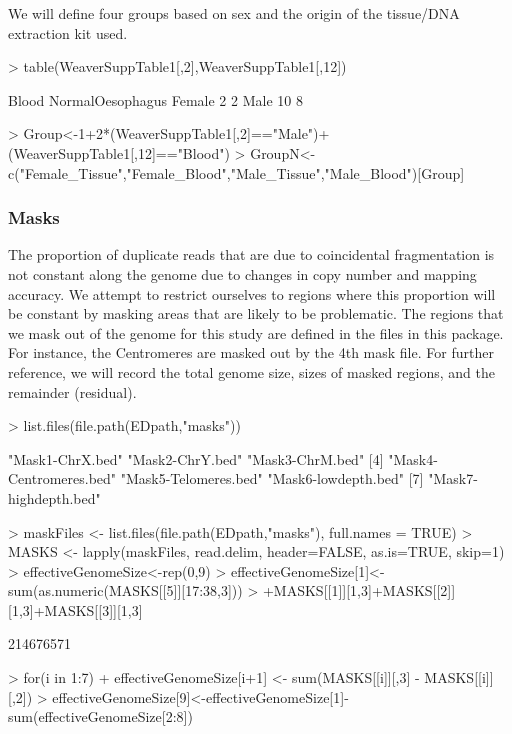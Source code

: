 \documentclass{article}
\begin{document}
We will define four groups based on sex and the origin of the tissue/DNA extraction kit used.

\begin{Schunk}
\begin{Sinput}
> table(WeaverSuppTable1[,2],WeaverSuppTable1[,12])
\end{Sinput}
\begin{Soutput}
         Blood NormalOesophagus
  Female     2                2
  Male      10                8
\end{Soutput}
\begin{Sinput}
> Group<-1+2*(WeaverSuppTable1[,2]=="Male")+(WeaverSuppTable1[,12]=="Blood")
> GroupN<-c("Female_Tissue","Female_Blood","Male_Tissue","Male_Blood")[Group]
\end{Sinput}
\end{Schunk}

\subsubsection{Masks}

The proportion of duplicate reads that are due to coincidental fragmentation is not constant along the genome due to changes in copy number and mapping accuracy. We attempt to restrict ourselves to regions where this proportion will be constant by masking areas that are likely to be problematic. The regions that we mask out of the genome for this study are defined in the  files in this package. For instance, the Centromeres are masked out by the 4th mask file. For further reference, we will record the total genome size, sizes of masked regions, and the remainder (residual).

\begin{Schunk}
\begin{Sinput}
> list.files(file.path(EDpath,"masks"))
\end{Sinput}
\begin{Soutput}
[1] "Mask1-ChrX.bed"        "Mask2-ChrY.bed"        "Mask3-ChrM.bed"       
[4] "Mask4-Centromeres.bed" "Mask5-Telomeres.bed"   "Mask6-lowdepth.bed"   
[7] "Mask7-highdepth.bed"  
\end{Soutput}
\begin{Sinput}
> maskFiles <- list.files(file.path(EDpath,"masks"), full.names = TRUE)
> MASKS <- lapply(maskFiles, read.delim, header=FALSE, as.is=TRUE, skip=1)
> effectiveGenomeSize<-rep(0,9)
> effectiveGenomeSize[1]<-sum(as.numeric(MASKS[[5]][17:38,3]))
> +MASKS[[1]][1,3]+MASKS[[2]][1,3]+MASKS[[3]][1,3]
\end{Sinput}
\begin{Soutput}
[1] 214676571
\end{Soutput}
\begin{Sinput}
> for(i in 1:7){ 
+     effectiveGenomeSize[i+1] <- sum(MASKS[[i]][,3] - MASKS[[i]][,2])}
> effectiveGenomeSize[9]<-effectiveGenomeSize[1]-sum(effectiveGenomeSize[2:8])
\end{Sinput}
\end{Schunk}
\end{document}

